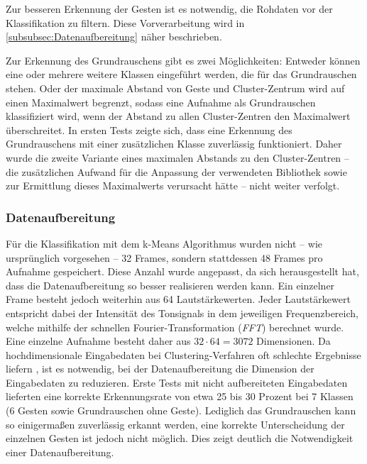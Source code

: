 Zur besseren Erkennung der Gesten ist es notwendig, die Rohdaten vor der Klassifikation zu filtern. Diese Vorverarbeitung wird in \autoref{subsubsec:Datenaufbereitung} näher beschrieben.

Zur Erkennung des Grundrauschens gibt es zwei Möglichkeiten: Entweder können eine oder mehrere weitere Klassen eingeführt werden, die für das Grundrauschen stehen. Oder der maximale Abstand von Geste und Cluster-Zentrum wird auf einen Maximalwert begrenzt, sodass
eine Aufnahme als Grundrauschen klassifiziert wird, wenn der Abstand zu allen Cluster-Zentren den Maximalwert überschreitet.
In ersten Tests zeigte sich, dass eine Erkennung des Grundrauschens mit einer zusätzlichen Klasse zuverlässig funktioniert. Daher wurde die zweite Variante eines maximalen Abstands zu den Cluster-Zentren -- die zusätzlichen Aufwand für die Anpassung der verwendeten Bibliothek sowie zur Ermittlung dieses Maximalwerts verursacht hätte -- nicht weiter verfolgt.


\subsubsection{Datenaufbereitung}\label{subsubsec:Datenaufbereitung}
Für die Klassifikation mit dem k-Means Algorithmus wurden nicht -- wie ursprünglich vorgesehen -- 32 Frames, sondern stattdessen 48 Frames pro Aufnahme gespeichert.  Diese Anzahl wurde angepasst, da sich herausgestellt hat, dass die Datenaufbereitung so besser realisieren werden kann.  Ein einzelner Frame besteht jedoch weiterhin aus 64 Lautstärkewerten.
Jeder Lautstärkewert entspricht dabei der Intensität des Tonsignals in dem jeweiligen Frequenzbereich, welche mithilfe der schnellen Fourier-Transformation (\emph{FFT}) \cite{fftMathebuch} berechnet wurde. Eine einzelne Aufnahme besteht daher aus $32 \cdot 64 = 3072$ Dimensionen.  Da hochdimensionale Eingabedaten bei Clustering-Verfahren oft schlechte Ergebnisse liefern \cite{kMeansHighDimensions}, ist es notwendig, bei der Datenaufbereitung die Dimension der Eingabedaten zu reduzieren.  Erste Tests mit nicht aufbereiteten 
Eingabedaten lieferten eine korrekte Erkennungsrate von etwa 25 bis 30 Prozent bei 7 Klassen (6 Gesten sowie Grundrauschen ohne Geste). Lediglich das Grundrauschen kann so einigermaßen zuverlässig erkannt werden, eine korrekte Unterscheidung der einzelnen Gesten ist jedoch nicht möglich. Dies zeigt deutlich die Notwendigkeit einer Datenaufbereitung.

